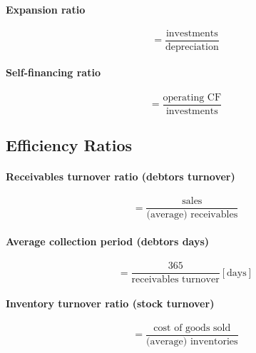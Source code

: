 \documentclass[a4paper] {scrartcl}
\begin{document}
\paragraph{Expansion ratio} %
\label{par:expansion_ratio}
\begin{equation}
	= \frac{\text{investments}}{\text{depreciation}}
\end{equation}

\paragraph{Self-financing ratio} %
\label{par:self_financing_ratio}
\begin{equation}
	= \frac{\text{operating CF}}{\text{investments}}
\end{equation}

\subsection{Efficiency Ratios}


\paragraph{Receivables turnover ratio (debtors turnover)} %
\label{par:receivables_turnover_ratio}
\begin{equation}
	= \frac{\text{sales}}{\text{(average) receivables}}
\end{equation}

\paragraph{Average collection period (debtors days)} %
\begin{equation}
	= \frac{365}{\text{receivables turnover}} [\text{days}]
\end{equation}
\label{par:average_collection_period}


\paragraph{Inventory turnover ratio (stock turnover)}
\begin{equation}
	= \frac{\text{cost of goods sold}}{\text{(average) inventories}}
\end{equation}
\end{document}
